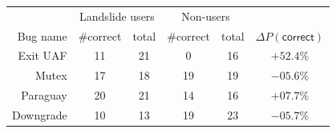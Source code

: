 \begin{table}[h]
	\begin{center}
	\begin{tabular}{r||cc|cc|c}
		& \multicolumn{2}{c|}{Landslide users} & \multicolumn{2}{c|}{Non-users} & \\
		Bug name & \#correct & total & \#correct & total & $\Delta P(\mathsf{correct})$ \\
		\hline
		Exit UAF  & 11	& 21	& 0	& 16	& $+52.4\%$ \\
		Mutex     & 17	& 18	& 19	& 19	& $-05.6\%$ \\
		Paraguay  & 20	& 21	& 14	& 16	& $+07.7\%$ \\
		Downgrade & 10	& 13	& 19	& 23	& $-05.7\%$ \\ %
		\hline

\end{tabular}
\end{center}
\end{table}
